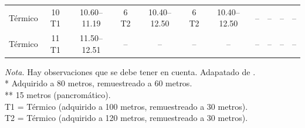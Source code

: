 \begin{table}[H]
\begin{spacing}{8}
\begin{tabularx}{\linewidth}{P{3cm}*{10}{c}}
                            Térmico & 10 T1 & 10.60–11.19 & 6 T2 & 10.40–12.50 & 6 T2 & 10.40–12.50 & -- & -- & -- & -- \\
                            Térmico & 11 T1 & 11.50–12.51 & -- & -- & -- & -- & -- & -- & -- & -- \\
                            \bottomrule
                        \end{tabularx}
                    \end{spacing}
                    \vspace{1\baselineskip}
                    \textit{Nota.} Hay observaciones que se debe tener en cuenta. Adapatado de \textcite{Landsat2023}. \\
                        * Adquirido a 80 metros, remuestreado a 60 metros. \\
                        ** 15 metros (pancromático). \\
                        T1 = Térmico (adquirido a 100 metros, remuestreado a 30 metros). \\
                        T2 = Térmico (adquirido a 120 metros, remuestreado a 30 metros). 
                    \label{BandasLandsat}
                \end{table}
            
